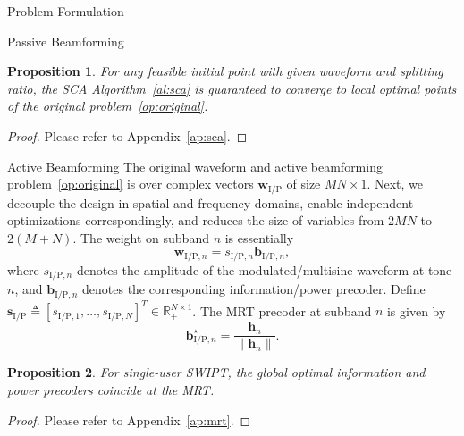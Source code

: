 \documentclass[journal]{IEEEtran}
\newtheorem{proposition}{Proposition}
\begin{document}
\begin{section}{Problem Formulation}
\begin{subsection}{Passive Beamforming}
			\begin{proposition}\label{pr:sca}
				For any feasible initial point with given waveform and splitting ratio, the SCA Algorithm~\ref{al:sca} is guaranteed to converge to local optimal points of the original problem~\eqref{op:original}.
			\end{proposition}

			\begin{proof}\label{pf:sca}
				Please refer to Appendix~\ref{ap:sca}.
			\end{proof}
		\end{subsection}

		\begin{subsection}{Active Beamforming}
			The original waveform and active beamforming problem~\eqref{op:original} is over complex vectors $\boldsymbol{w}_{\mathrm{I/P}}$ of size $MN \times 1$. Next, we decouple the design in spatial and frequency domains, enable independent optimizations correspondingly, and reduces the size of variables from $2MN$ to $2(M+N)$. The weight on subband $n$ is essentially
			\begin{equation}\label{eq:w}
				\boldsymbol{w}_{\mathrm{I/P}, n} = s_{\mathrm{I/P}, n} \boldsymbol{b}_{\mathrm{I/P}, n},
			\end{equation}
			where $s_{\mathrm{I/P},n}$ denotes the amplitude of the modulated/multisine waveform at tone $n$, and $\boldsymbol{b}_{\mathrm{I/P}, n}$ denotes the corresponding information/power precoder. Define $\boldsymbol{s}_{\mathrm{I/P}} \triangleq [s_{\mathrm{I/P},1},\dots,s_{\mathrm{I/P},N}]^T \in \mathbb{R}_+^{N \times 1}$. The MRT precoder at subband $n$ is given by
			\begin{equation}\label{eq:b_n}
				\boldsymbol{b}_{\mathrm{I/P}, n}^\star = \frac{\boldsymbol{h}_n}{\lVert{\boldsymbol{h}_n}\rVert}.
			\end{equation}

			\begin{proposition}\label{pr:mrt}
				For single-user SWIPT, the global optimal information and power precoders coincide at the MRT.
			\end{proposition}

			\begin{proof}\label{pf:mrt}
				Please refer to Appendix~\ref{ap:mrt}.
			\end{proof}
		\end{subsection}



\end{section}
\end{document}
